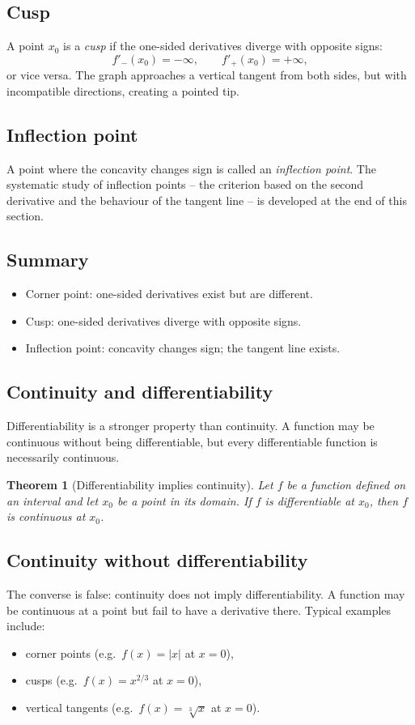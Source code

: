 \documentclass[11pt,a4paper]{article}
\theoremstyle{definition} \newtheorem{definition}{Definition} \theoremstyle{plain} \newtheorem{theorem}{Theorem}
\begin{document}
\subsection*{Cusp}
A point $x_0$ is a \emph{cusp} if the one-sided derivatives diverge with opposite signs:
\[ f'_-(x_0) = -\infty, \qquad f'_+(x_0) = +\infty, \]
or vice versa.
The graph approaches a vertical tangent from both sides, but with incompatible directions, creating a pointed tip.
\subsection*{Inflection point}
A point where the concavity changes sign is called an \emph{inflection point}. The systematic study of inflection points -- the criterion based on the second derivative and the behaviour of the tangent line -- is developed at the end of this section.
\subsection*{Summary}
\begin{itemize}
\item Corner point: one-sided derivatives exist but are different.
\item Cusp: one-sided derivatives diverge with opposite signs.
\item Inflection point: concavity changes sign; the tangent line exists. \end{itemize}
\subsection*{Continuity and differentiability}
Differentiability is a stronger property than continuity.
A function may be continuous without being differentiable, but every differentiable function is necessarily continuous.
\begin{theorem}[Differentiability implies continuity]\label{thm:differentiability-continuity} Let $f$ be a function defined on an interval and let $x_0$ be a point in its domain.
If $f$ is differentiable at $x_0$, then $f$ is continuous at $x_0$. \end{theorem}
\subsection*{Continuity without differentiability}
The converse is false: continuity does not imply differentiability.
A function may be continuous at a point but fail to have a derivative there.
Typical examples include: \begin{itemize}
\item corner points (e.g.\ $f(x)=|x|$ at $x=0$),
\item cusps (e.g.\ $f(x)=x^{2/3}$ at $x=0$),
\item vertical tangents (e.g.\ $f(x)=\sqrt[3]{x}$ at $x=0$). \end{itemize}
\end{document}
